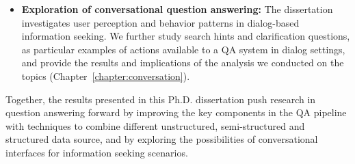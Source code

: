 \begin{itemize}
	\item \textbf{Exploration of conversational question answering:} The dissertation investigates user perception and behavior patterns in dialog-based information seeking.
	We further study search hints and clarification questions, as particular examples of actions available to a QA system in dialog settings, and provide the results and implications of the analysis we conducted on the topics (Chapter~\ref{chapter:conversation}).
\end{itemize}

Together, the results presented in this Ph.D. dissertation push research in question answering forward by improving the key components in the QA pipeline with techniques to combine different unstructured, semi-structured and structured data source, and by exploring the possibilities of conversational interfaces for information seeking scenarios. 


